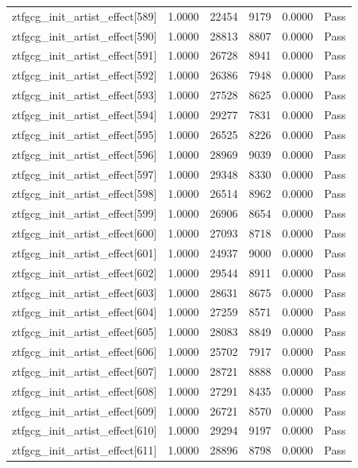 \begin{table}[htbp]
\begin{tabular}{llrrll}
ztfgcg\_init\_artist\_effect[589] & 1.0000 & 22454 & 9179 & 0.0000 & Pass \\
ztfgcg\_init\_artist\_effect[590] & 1.0000 & 28813 & 8807 & 0.0000 & Pass \\
ztfgcg\_init\_artist\_effect[591] & 1.0000 & 26728 & 8941 & 0.0000 & Pass \\
ztfgcg\_init\_artist\_effect[592] & 1.0000 & 26386 & 7948 & 0.0000 & Pass \\
ztfgcg\_init\_artist\_effect[593] & 1.0000 & 27528 & 8625 & 0.0000 & Pass \\
ztfgcg\_init\_artist\_effect[594] & 1.0000 & 29277 & 7831 & 0.0000 & Pass \\
ztfgcg\_init\_artist\_effect[595] & 1.0000 & 26525 & 8226 & 0.0000 & Pass \\
ztfgcg\_init\_artist\_effect[596] & 1.0000 & 28969 & 9039 & 0.0000 & Pass \\
ztfgcg\_init\_artist\_effect[597] & 1.0000 & 29348 & 8330 & 0.0000 & Pass \\
ztfgcg\_init\_artist\_effect[598] & 1.0000 & 26514 & 8962 & 0.0000 & Pass \\
ztfgcg\_init\_artist\_effect[599] & 1.0000 & 26906 & 8654 & 0.0000 & Pass \\
ztfgcg\_init\_artist\_effect[600] & 1.0000 & 27093 & 8718 & 0.0000 & Pass \\
ztfgcg\_init\_artist\_effect[601] & 1.0000 & 24937 & 9000 & 0.0000 & Pass \\
ztfgcg\_init\_artist\_effect[602] & 1.0000 & 29544 & 8911 & 0.0000 & Pass \\
ztfgcg\_init\_artist\_effect[603] & 1.0000 & 28631 & 8675 & 0.0000 & Pass \\
ztfgcg\_init\_artist\_effect[604] & 1.0000 & 27259 & 8571 & 0.0000 & Pass \\
ztfgcg\_init\_artist\_effect[605] & 1.0000 & 28083 & 8849 & 0.0000 & Pass \\
ztfgcg\_init\_artist\_effect[606] & 1.0000 & 25702 & 7917 & 0.0000 & Pass \\
ztfgcg\_init\_artist\_effect[607] & 1.0000 & 28721 & 8888 & 0.0000 & Pass \\
ztfgcg\_init\_artist\_effect[608] & 1.0000 & 27291 & 8435 & 0.0000 & Pass \\
ztfgcg\_init\_artist\_effect[609] & 1.0000 & 26721 & 8570 & 0.0000 & Pass \\
ztfgcg\_init\_artist\_effect[610] & 1.0000 & 29294 & 9197 & 0.0000 & Pass \\
ztfgcg\_init\_artist\_effect[611] & 1.0000 & 28896 & 8798 & 0.0000 & Pass \\

\end{tabular}
\end{table}
